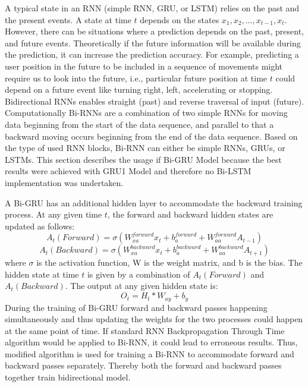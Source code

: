 A typical state in an RNN (simple RNN, GRU, or LSTM) relies on the past and the present events. A state at time $t$ depends on the states $x_1, x_2,..., x_{t-1}, x_t$. However, there can be situations where a prediction depends on the past, present, and future events. Theoretically if the future information will be available during the prediction, it can increase the prediction accuracy. For example, predicting a user position in the future to be included in a sequence of movements might require us to look into the future, i.e., particular future position at time $t$ could depend on a future event like turning right, left, accelerating or stopping. Bidirectional RNNs enables straight (past) and reverse traversal of input (future). Computationally Bi-RNNs are a combination of two simple RNNs for moving data beginning from the start of the data sequence, and parallel to that a backward moving occurs beginning from the end of the data sequence. Based on the type of used RNN blocks, Bi-RNN can either be simple RNNs, GRUs, or LSTMs. This section describes the usage if Bi-GRU Model because the best results were achieved with GRU1 Model and therefore no Bi-LSTM implementation was undertaken.

A Bi-GRU has an additional hidden layer to accommodate the backward training process. At any given time 
$t$, the forward and backward hidden states are updated as follows:
\begin{equation}
A_t(Forward) = \sigma (W_{xa}^{forward}x_t + b_{a}^{forward} + W_{aa}^{forward}A_{t-1})
\end{equation}
\begin{equation}
A_t(Backward) = \sigma (W_{xa}^{backward}x_t + b_{a}^{backward} + W_{aa}^{backward}A_{t+1})
\end{equation}
where 
$\sigma$ is the activation function, W is the weight matrix, and b is the bias. The hidden state at time $t$ is given by a combination of $A_t(Forward)$ and $A_t(Backward)$. The output at any given hidden state is:
\begin{equation}
O_t = H_t * W_{ay} + b_y
\end{equation}
During the training of Bi-GRU forward and backward passes happening simultaneously and thus updating the weights for the two processes could happen at the same point of time. If standard RNN Backpropagation Through Time algorithm would be applied to Bi-RNN, it could lead to erroneous results. Thus, modified algorithm is used for training a Bi-RNN to accommodate forward and backward passes separately. Thereby both the forward and backward passes together train bidirectional model. 

